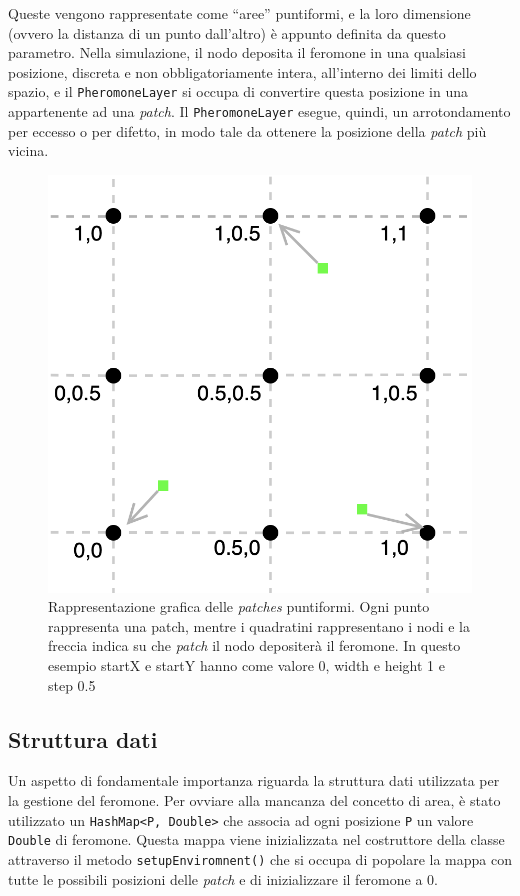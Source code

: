 Queste vengono rappresentate come ``aree'' puntiformi, e la loro dimensione (ovvero la distanza di un punto dall'altro) è appunto definita da questo parametro.
Nella simulazione, il nodo deposita il feromone in una qualsiasi posizione, discreta e non obbligatoriamente intera, all'interno dei limiti dello spazio, e il \texttt{PheromoneLayer} 
si occupa di convertire questa posizione in una appartenente ad una \textit{patch}. 
Il \texttt{PheromoneLayer} esegue, quindi, un arrotondamento per eccesso o per difetto, in modo tale da ottenere la posizione della \textit{patch} più vicina.
\begin{figure}[ht]
    \centering
    \includegraphics[width=.5\linewidth]{figures/patch-nodi.png}
    \caption{Rappresentazione grafica delle \textit{patches} puntiformi. Ogni punto rappresenta una patch,
    mentre i quadratini rappresentano i nodi e la freccia indica su che \textit{patch} il nodo depositerà il feromone. In questo esempio
    startX e startY hanno come valore 0, width e height 1 e step 0.5}\label{fig:patch-nodi}
\end{figure}

\subsection{Struttura dati}\label{strDati}
Un aspetto di fondamentale importanza riguarda la struttura dati utilizzata per la gestione del feromone.
Per ovviare alla mancanza del concetto di area, è stato utilizzato un \texttt{HashMap<P, Double>} che associa ad ogni posizione \texttt{P} un valore \texttt{Double} di feromone.
Questa mappa viene inizializzata nel costruttore della classe attraverso il metodo \texttt{setupEnviromnent()} che si occupa di popolare la mappa
con tutte le possibili posizioni delle \textit{patch} e di inizializzare il feromone a 0.\newline

